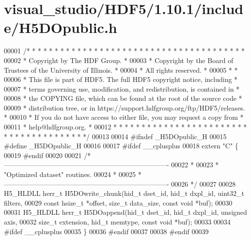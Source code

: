 \hypertarget{visual__studio_2_h_d_f5_21_810_81_2include_2_h5_d_opublic_8h_source}{}\section{visual\+\_\+studio/\+H\+D\+F5/1.10.1/include/\+H5\+D\+Opublic.h}
\label{visual__studio_2_h_d_f5_21_810_81_2include_2_h5_d_opublic_8h_source}

\begin{DoxyCode}
00001 \textcolor{comment}{/* * * * * * * * * * * * * * * * * * * * * * * * * * * * * * * * * * * * * * *}
00002 \textcolor{comment}{ * Copyright by The HDF Group.                                               *}
00003 \textcolor{comment}{ * Copyright by the Board of Trustees of the University of Illinois.         *}
00004 \textcolor{comment}{ * All rights reserved.                                                      *}
00005 \textcolor{comment}{ *                                                                           *}
00006 \textcolor{comment}{ * This file is part of HDF5.  The full HDF5 copyright notice, including     *}
00007 \textcolor{comment}{ * terms governing use, modification, and redistribution, is contained in    *}
00008 \textcolor{comment}{ * the COPYING file, which can be found at the root of the source code       *}
00009 \textcolor{comment}{ * distribution tree, or in https://support.hdfgroup.org/ftp/HDF5/releases.  *}
00010 \textcolor{comment}{ * If you do not have access to either file, you may request a copy from     *}
00011 \textcolor{comment}{ * help@hdfgroup.org.                                                        *}
00012 \textcolor{comment}{ * * * * * * * * * * * * * * * * * * * * * * * * * * * * * * * * * * * * * * */}
00013 
00014 \textcolor{preprocessor}{#ifndef \_H5DOpublic\_H}
00015 \textcolor{preprocessor}{#define \_H5DOpublic\_H}
00016 
00017 \textcolor{preprocessor}{#ifdef \_\_cplusplus}
00018 \textcolor{keyword}{extern} \textcolor{stringliteral}{"C"} \{
00019 \textcolor{preprocessor}{#endif}
00020 
00021 \textcolor{comment}{/*-------------------------------------------------------------------------}
00022 \textcolor{comment}{ *}
00023 \textcolor{comment}{ * "Optimized dataset" routines.}
00024 \textcolor{comment}{ *}
00025 \textcolor{comment}{ *-------------------------------------------------------------------------}
00026 \textcolor{comment}{ */}
00027 
00028 H5\_HLDLL herr\_t H5DOwrite\_chunk(hid\_t dset\_id, hid\_t dxpl\_id, uint32\_t filters, 
00029     \textcolor{keyword}{const} hsize\_t *offset, \textcolor{keywordtype}{size\_t} data\_size, \textcolor{keyword}{const} \textcolor{keywordtype}{void} *buf);
00030 
00031 H5\_HLDLL herr\_t H5DOappend(hid\_t dset\_id, hid\_t dxpl\_id, \textcolor{keywordtype}{unsigned} axis,
00032     \textcolor{keywordtype}{size\_t} extension, hid\_t memtype, \textcolor{keyword}{const} \textcolor{keywordtype}{void} *buf);
00033 
00034 \textcolor{preprocessor}{#ifdef \_\_cplusplus}
00035 \}
00036 \textcolor{preprocessor}{#endif}
00037 
00038 \textcolor{preprocessor}{#endif}
00039 
\end{DoxyCode}
